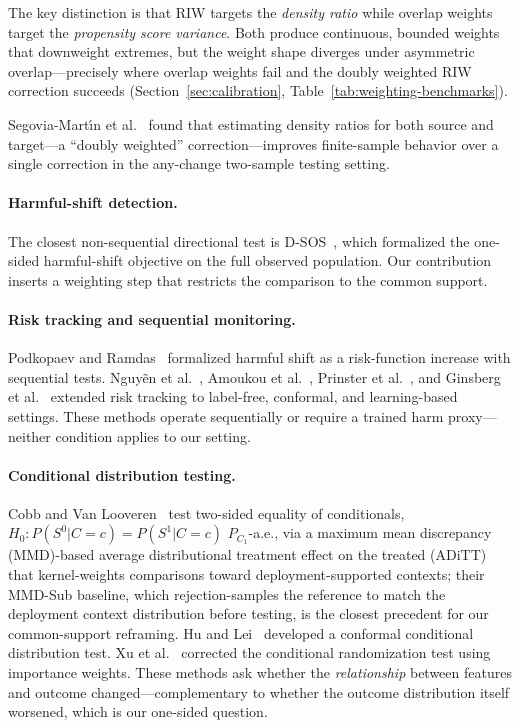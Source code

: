 The key distinction is that RIW targets the \emph{density ratio} while overlap weights target the \emph{propensity score variance}. Both produce continuous, bounded weights that downweight extremes, but the weight shape diverges under asymmetric overlap---precisely where overlap weights fail and the doubly weighted RIW correction succeeds (Section~\ref{sec:calibration}, Table~\ref{tab:weighting-benchmarks}).

Segovia-Mart{\'\i}n et al.~\cite{SegoviaMartin_2023} found that estimating density ratios for both source and target---a ``doubly weighted'' correction---improves finite-sample behavior over a single correction in the any-change two-sample testing setting.

\paragraph{Harmful-shift detection.}
The closest non-sequential directional test is D-SOS~\cite{pmlr-v180-kamulete22a}, which formalized the one-sided harmful-shift objective on the full observed population. Our contribution inserts a weighting step that restricts the comparison to the common support.

\paragraph{Risk tracking and sequential monitoring.}
Podkopaev and Ramdas~\cite{Podkopaev_Ramdas_2022} formalized harmful shift as a risk-function increase with sequential tests. Nguy{\~e}n et al.~\cite{Nguyen_D3M_2025}, Amoukou et al.~\cite{Amoukou_2024}, Prinster et al.~\cite{Prinster_2025}, and Ginsberg et al.~\cite{Ginsberg_2023} extended risk tracking to label-free, conformal, and learning-based settings. These methods operate sequentially or require a trained harm proxy---neither condition applies to our setting.

\paragraph{Conditional distribution testing.}
Cobb and Van Looveren~\cite{pmlr-v162-cobb22a} test two-sided equality of conditionals, $H_0: P(S^0|C=c)=P(S^1|C=c)$ $P_{C_1}$-a.e., via a maximum mean discrepancy (MMD)-based average distributional treatment effect on the treated (ADiTT) that kernel-weights comparisons toward deployment-supported contexts; their MMD-Sub baseline, which rejection-samples the reference to match the deployment context distribution before testing, is the closest precedent for our common-support reframing. Hu and Lei~\cite{Hu_2024} developed a conformal conditional distribution test. Xu et al.~\cite{Xu_2024_crt} corrected the conditional randomization test using importance weights. These methods ask whether the \emph{relationship} between features and outcome changed---complementary to whether the outcome distribution itself worsened, which is our one-sided question.

